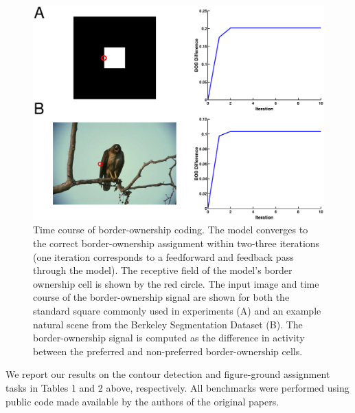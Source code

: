 \begin{figure}[t!]
\centering
\includegraphics[width=\textwidth]{NaturalImage/figs/BOS_timecourse.eps}
\makeatletter
\let\@currsize\normalsize
\caption[Time course of border-ownership coding]{Time course of border-ownership coding. The model converges to the correct border-ownership assignment within two-three iterations (one iteration corresponds to a feedforward and feedback pass through the model). The receptive field of the model's border ownership cell is shown by the red circle. The input image and time course of the border-ownership signal are shown for both the standard square commonly used in experiments (A) and an example natural scene from the Berkeley Segmentation Dataset (B). The border-ownership signal is computed as the difference in activity between the preferred and non-preferred border-ownership cells.}
\label{Fig:results_time}
\end{figure}

We report our results on the contour detection and figure-ground assignment tasks in Tables 1 and 2 above, respectively. All benchmarks were performed using public code made available by the authors of the original papers.

